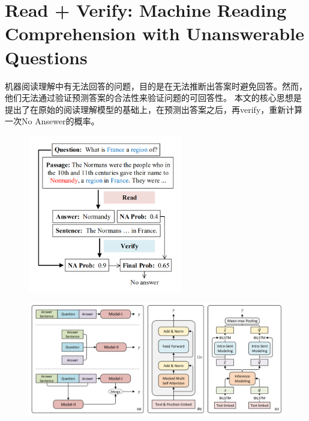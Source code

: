 \documentclass[a4paper,UTF8]{article}
\numberwithin{equation}{section}
\begin{document}
\section{Read + Verify: Machine Reading Comprehension with Unanswerable Questions}
机器阅读理解中有无法回答的问题，目的是在无法推断出答案时避免回答。然而，他们无法通过验证预测答案的合法性来验证问题的可回答性。
本文的核心思想是提出了在原始的阅读理解模型的基础上，在预测出答案之后，再verify，重新计算一次No Ansewer的概率。
\begin{figure}[H]
	\centering
	\includegraphics[width=0.6\textwidth]{6-1.png}
\end{figure}
\begin{figure}[H]
	\centering
	\includegraphics[width=\textwidth]{6-2.png}
\end{figure}
\end{document}
